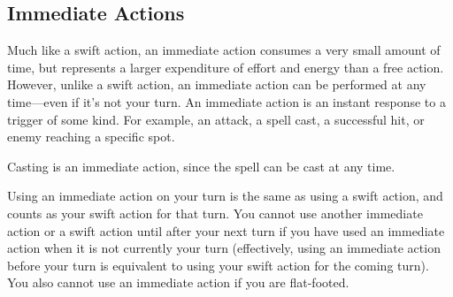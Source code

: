 \subsection{Immediate Actions}

Much like a swift action, an immediate action consumes a very small amount of time, but represents a larger expenditure of effort and energy than a free action. However, unlike a swift action, an immediate action can be performed at any time---even if it's not your turn. An immediate action is an instant response to a trigger of some kind. For example, an attack, a spell cast, a successful hit, or enemy reaching a specific spot.

Casting  is an immediate action, since the spell can be cast at any time.

Using an immediate action on your turn is the same as using a swift action, and counts as your swift action for that turn. You cannot use another immediate action or a swift action until after your next turn if you have used an immediate action when it is not currently your turn (effectively, using an immediate action before your turn is equivalent to using your swift action for the coming turn). You also cannot use an immediate action if you are flat-footed.
